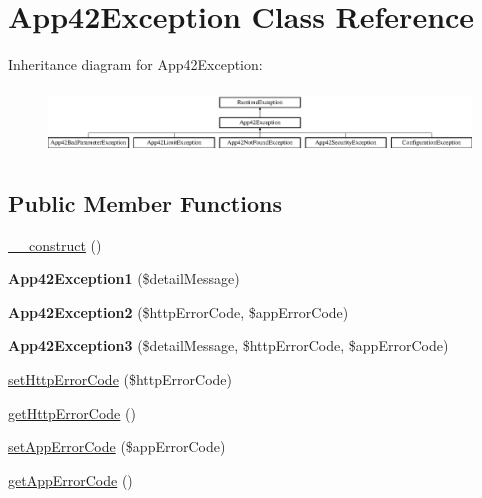 \hypertarget{class_app42_exception}{\section{App42\+Exception Class Reference}
\label{class_app42_exception}
}
Inheritance diagram for App42\+Exception\+:\begin{figure}[H]
\begin{center}
\leavevmode
\includegraphics[height=1.750000cm]{class_app42_exception}
\end{center}
\end{figure}
\subsection*{Public Member Functions}
\begin{DoxyCompactItemize}
\item 
\hyperlink{class_app42_exception_a095c5d389db211932136b53f25f39685}{\+\_\+\+\_\+construct} ()
\item 
\hypertarget{class_app42_exception_ab0da731796782133a8a6c871755ea301}{{\bfseries App42\+Exception1} (\$detail\+Message)}\label{class_app42_exception_ab0da731796782133a8a6c871755ea301}

\item 
\hypertarget{class_app42_exception_a61587ac35fa4759d47549fd2700664fd}{{\bfseries App42\+Exception2} (\$http\+Error\+Code, \$app\+Error\+Code)}\label{class_app42_exception_a61587ac35fa4759d47549fd2700664fd}

\item 
\hypertarget{class_app42_exception_a9856b8739b4f4aa9bfabfa63aa23164d}{{\bfseries App42\+Exception3} (\$detail\+Message, \$http\+Error\+Code, \$app\+Error\+Code)}\label{class_app42_exception_a9856b8739b4f4aa9bfabfa63aa23164d}

\item 
\hyperlink{class_app42_exception_a8bdc96d9a86abfd60c83526587ebadbc}{set\+Http\+Error\+Code} (\$http\+Error\+Code)
\item 
\hyperlink{class_app42_exception_a844b333cbc152e855bfd522fa57f1084}{get\+Http\+Error\+Code} ()
\item 
\hyperlink{class_app42_exception_ab75c1a3b13b777c27beb875a58090838}{set\+App\+Error\+Code} (\$app\+Error\+Code)
\item 
\hyperlink{class_app42_exception_a65cd174f7c180c08b30c0d3232b42f71}{get\+App\+Error\+Code} ()
\end{DoxyCompactItemize}


